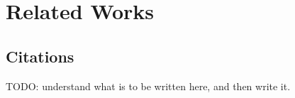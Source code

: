 \chapter{Related Works}
\label{cha:related_works}

\section{Citations}
\label{cha:examples_citations} TODO: understand what is to be written here, and
then write it.